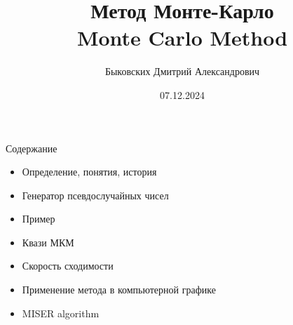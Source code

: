 \documentclass{beamer}
\title[ММК]{Метод Монте-Карло \\ Monte Carlo Method}
\author[Быковских Д.А.]{Быковских Дмитрий Александрович}
\date{07.12.2024}
\begin{document}
	\begin{frame}
		\titlepage
	\end{frame}
	\begin{frame}{Содержание}
		\begin{itemize}
			\item 
			Определение, понятия, история
			\item
			Генератор псевдослучайных чисел
			\item
			Пример
			\item
			Квази МКМ
			\item 
			Скорость сходимости
			\item 
			Применение метода в компьютерной графике
			\item
			MISER algorithm
		\end{itemize}

		\note{
					
					
			
		}
	\end{frame}
\end{document}
